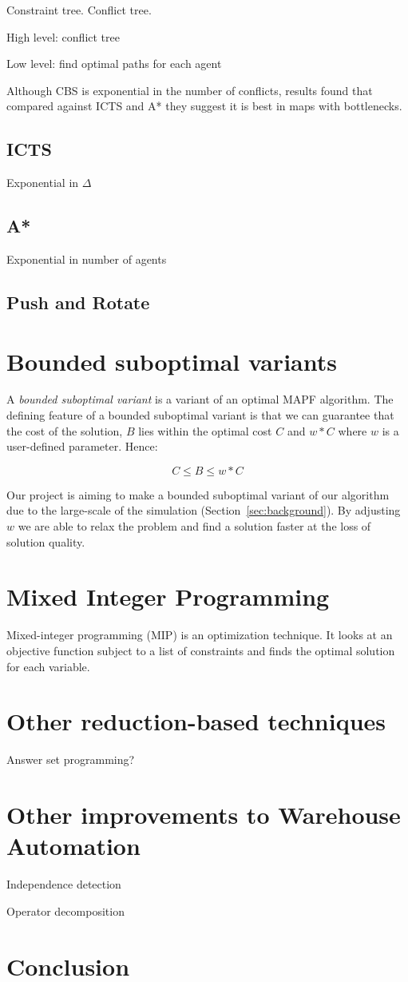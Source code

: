 \documentclass[a4paper,11pt]{article}
\begin{document}
Constraint tree.
Conflict tree.

High level: conflict tree

Low level: find optimal paths for each agent

Although CBS is exponential in the number of conflicts, results found that compared against ICTS and A* they suggest it is best in maps with bottlenecks.

\subsection{ICTS}

Exponential in $\Delta$

\subsection{A*}
Exponential in number of agents

\subsection{Push and Rotate}
\cite{wilde2014push}


\section{Bounded suboptimal variants}
A \textit{bounded suboptimal variant} is a variant of an optimal MAPF algorithm. The defining feature of a bounded suboptimal variant is that we can guarantee that the cost of the solution, $B$ lies within the optimal cost $C$ and $w*C$ where $w$ is a user-defined parameter. Hence:

\[C \le B \le w*C\]


Our project is aiming to make a bounded suboptimal variant of our algorithm due to the large-scale of the simulation (Section~\ref{sec:background}). By adjusting $w$ we are able to relax the problem and find a solution faster at the loss of solution quality.

\section{Mixed Integer Programming}
Mixed-integer programming (MIP) is an optimization technique. It looks at an objective function subject to a list of constraints and finds the optimal solution for each variable.

\cite{yu2013planning}


\section{Other reduction-based techniques}
Answer set programming?



\section{Other improvements to Warehouse Automation}
Independence detection

Operator decomposition

\section{Conclusion}




	
\end{document}
